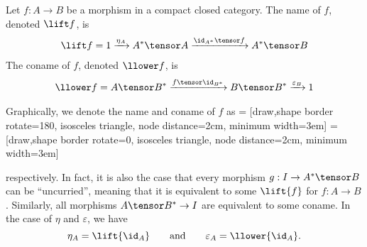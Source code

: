 \begin{definition}
    Let $f : A \rightarrow B$ be a morphism in a compact closed category. The name of $f$,
    denoted $\lift f$, is
    \begin{align*}
        \lift f = 1 
         \xrightarrow{\eta_A} A^* \tensor A
         \xrightarrow{\id_{A^*} \tensor f} A^* \tensor B
    \end{align*}
    The coname of $f$, denoted $\llower f$, is
    \begin{align*}
        \llower f = A \tensor B^*
        \xrightarrow{f \tensor \id_{B^*}} B \tensor B^*
        \xrightarrow{\varepsilon_B} 1
    \end{align*}
\end{definition}
Graphically, we denote the name and coname of $f$ as
 = [draw,shape border rotate=180, 
                        isosceles triangle,
                        node distance=2cm, minimum width=3em]
 = [draw,shape border rotate=0,
                        isosceles triangle,
                        node distance=2cm, minimum width=3em]

\begin{center} 
\qquad{}\qquad
{} \end{center}
respectively.
In fact, it is also the case that every morphism $g : I \rightarrow A^* \tensor B$ can
be ``uncurried'', meaning that it is equivalent to some $\lift{f}$ for $f:A \rightarrow B$.
Similarly, all morphisms $A \tensor B^* \rightarrow I$ are equivalent to some coname.
In the case of $\eta$ and $\varepsilon$, we have
\[ \eta_A = \lift{\id_A} \qquad\text{and}\qquad \varepsilon_A = \llower{\id_A}. \]

